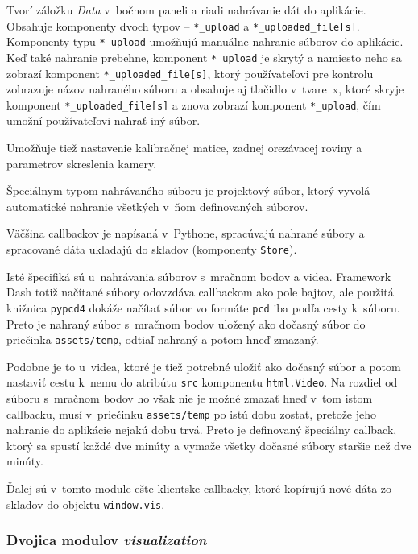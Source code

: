 Tvorí záložku \emph{Data} v~bočnom paneli a riadi nahrávanie dát do aplikácie. Obsahuje komponenty dvoch typov -- \texttt{*\_upload} a \texttt{*\_uploaded\_file[s]}. Komponenty typu \texttt{*\_upload} umožňujú manuálne nahranie súborov do aplikácie. Keď také nahranie prebehne, komponent \texttt{*\_upload} je skrytý a namiesto neho sa zobrazí komponent \texttt{*\_uploaded\_file[s]}, ktorý používateľovi pre kontrolu zobrazuje názov nahraného súboru a obsahuje aj tlačidlo v~tvare~x, ktoré skryje komponent \texttt{*\_uploaded\_file[s]} a znova zobrazí komponent \texttt{*\_upload}, čím umožní používateľovi nahrať iný súbor.

Umožňuje tiež nastavenie kalibračnej matice, zadnej orezávacej roviny a parametrov skreslenia kamery.

Špeciálnym typom nahrávaného súboru je projektový súbor, ktorý vyvolá automatické nahranie všetkých v~ňom definovaných súborov.

Väčšina callbackov je napísaná v~Pythone, spracúvajú nahrané súbory a spracované dáta ukladajú do skladov (komponenty \texttt{Store}).

Isté špecifiká sú u~nahrávania súborov s~mračnom bodov a videa. Framework Dash totiž načítané súbory odovzdáva callbackom ako pole bajtov, ale použitá knižnica \texttt{pypcd4} dokáže načítať súbor vo formáte \texttt{pcd} iba podľa cesty k~súboru. Preto je nahraný súbor s~mračnom bodov uložený ako dočasný súbor do priečinka \texttt{assets/temp}, odtiaľ nahraný a potom hneď zmazaný.

Podobne je to u~videa, ktoré je tiež potrebné uložiť ako dočasný súbor a potom nastaviť cestu k~nemu do atribútu \texttt{src} komponentu \texttt{html.Video}. Na rozdiel od súboru s~mračnom bodov ho však nie je možné zmazať hneď v~tom istom callbacku, musí v~priečinku \texttt{assets/temp} po istú dobu zostať, pretože jeho nahranie do aplikácie nejakú dobu trvá. Preto je definovaný špeciálny callback, ktorý sa spustí každé dve minúty a vymaže všetky dočasné súbory staršie než dve minúty.

Ďalej sú v~tomto module ešte klientske callbacky, ktoré kopírujú nové dáta zo skladov do objektu \texttt{window.vis}.

\subsubsection{Dvojica modulov \emph{visualization} }

